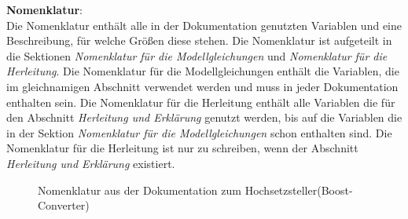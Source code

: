 \textbf{Nomenklatur}:\\
Die Nomenklatur enthält alle in der Dokumentation genutzten Variablen und eine Beschreibung, für welche Größen diese stehen. Die Nomenklatur ist aufgeteilt in die Sektionen \textit{Nomenklatur für die Modellgleichungen} und \textit{Nomenklatur für die Herleitung}. Die Nomenklatur für die Modellgleichungen enthält die Variablen, die im gleichnamigen Abschnitt verwendet werden und muss in jeder Dokumentation enthalten sein. Die Nomenklatur für die Herleitung enthält alle Variablen die für den Abschnitt \textit{Herleitung und Erklärung} genutzt werden, bis auf die Variablen die in der Sektion \textit{Nomenklatur für die Modellgleichungen} schon enthalten sind. Die Nomenklatur für die Herleitung ist nur zu schreiben, wenn der Abschnitt \textit{Herleitung und Erklärung} existiert.

\begin{figure}[H]
	\centering
	\caption{Nomenklatur aus der Dokumentation zum Hochsetzsteller(Boost-Converter)}
	\label{fig:BspDok_Nomenclature}
\end{figure}

